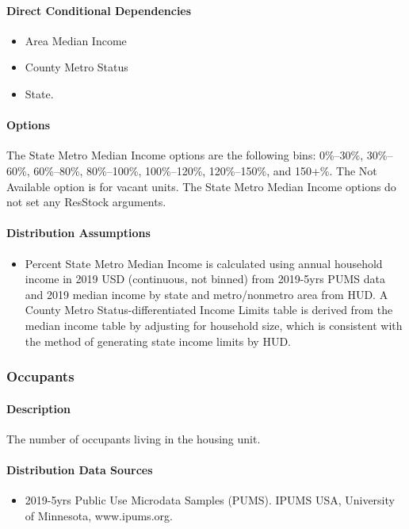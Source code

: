 \paragraph{Direct Conditional Dependencies}
\begin{itemize}
    \item Area Median Income
    \item County Metro Status
    \item State.
\end{itemize}

\paragraph{Options}
The State Metro Median Income options are the following bins: 0\%--30\%, 30\%--60\%, 60\%--80\%, 80\%--100\%, 100\%--120\%, 120\%--150\%, and 150+\%. The Not Available option is for vacant units. The State Metro Median Income options do not set any ResStock arguments.

\paragraph{Distribution Assumptions}
\begin{itemize}
\item
  Percent State Metro Median Income is calculated using annual household
  income in 2019 USD (continuous, not binned) from 2019-5yrs PUMS data
  and 2019 median income by state and metro/nonmetro area from HUD. A
  County Metro Status-differentiated Income Limits table is derived from
  the median income table by adjusting for household size, which is consistent with the method of generating state income limits by HUD.
\end{itemize}

\subsubsection{Occupants}\label{occupants}
\paragraph{Description}
The number of occupants living in the housing unit.

\paragraph{Distribution Data Sources}
\begin{itemize}
\item
  2019-5yrs Public Use Microdata Samples (PUMS). IPUMS USA, University
  of Minnesota, www.ipums.org.
\end{itemize}

